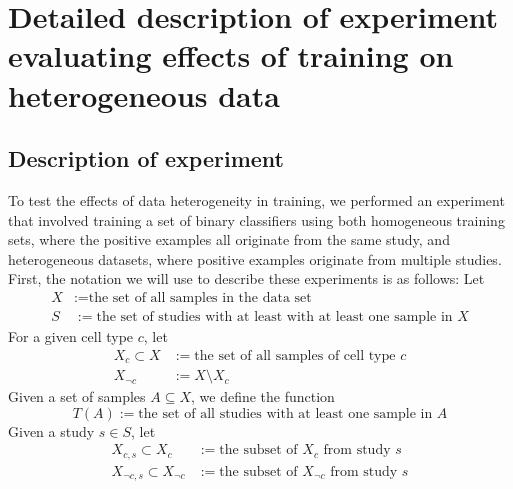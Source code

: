 \chapter{Detailed description of experiment evaluating effects of training on heterogeneous data } \label{app:sample_pred}

\section{Description of experiment }

To test the effects of data heterogeneity in training, we performed an experiment that involved training a set of binary classifiers using both homogeneous training sets, where the positive examples all originate from the same study, and heterogeneous datasets, where positive examples originate from multiple studies.  First, the notation we will use to describe these experiments is as follows: Let
\begin{align*}
X &:= \text{the set of all samples in the data set}\\
S &:= \text{the set of studies with at least with at least one sample in $X$}
\end{align*}
For a given cell type $c$, let
\begin{align*}
X_c \subset X &:= \text{the set of  all samples of cell type }c\\
X_{\neg c} &:= X \setminus X_c
\end{align*}
Given a set of samples $A \subseteq X$, we define the function 
$$T(A) := \text{the set of all studies with at least one sample in $A$}$$ 
Given a study $s \in S$, let
\begin{align*}
X_{c,s} \subset X_c &:= \text{the subset of $X_c$ from study $s$} \\
X_{\neg c,s} \subset X_{\neg c} &:= \text{the subset of $X_{\neg c}$ from study $s$}
\end{align*}


